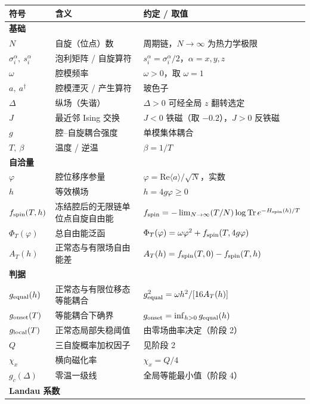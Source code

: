 \documentclass[UTF8,11pt,a4paper]{ctexart}
\begin{document}
{\footnotesize
\begin{longtable}{@{}p{2.1cm}p{6.0cm}p{6.2cm}@{}}
\toprule
符号 & 含义 & 约定 / 取值 \\
\midrule
\endhead
\multicolumn{3}{l}{\textbf{基础}} \\
$N$ & 自旋（位点）数 & 周期链，$N\to\infty$ 为热力学极限 \\
$\sigma_i^\alpha,\ s_i^\alpha$ & 泡利矩阵 / 自旋算符 & $s_i^\alpha=\sigma_i^\alpha/2$，$\alpha=x,y,z$ \\
$\omega$ & 腔模频率 & $\omega>0$，取 $\omega=1$ \\
$a,\ a^\dagger$ & 腔模湮灭 / 产生算符 & 玻色子 \\
$\Delta$ & 纵场（失谐） & $\Delta>0$ 可经全局 $z$ 翻转选定 \\
$J$ & 最近邻 Ising 交换 & $J<0$ 铁磁（取 $-0.2$），$J>0$ 反铁磁 \\
$g$ & 腔--自旋耦合强度 & 单模集体耦合 \\
$T,\ \beta$ & 温度 / 逆温 & $\beta=1/T$ \\
\midrule
\multicolumn{3}{l}{\textbf{自洽量}} \\
$\varphi$ & 腔位移序参量 & $\varphi=\mathrm{Re}\langle a\rangle/\sqrt N$，实数 \\
$h$ & 等效横场 & $h=4g\varphi\ge0$ \\
$f_{\rm spin}(T,h)$ & 冻结腔后的无限链单位点自旋自由能 & $f_{\rm spin}=-\lim_{N\to\infty}(T/N)\log\operatorname{Tr}e^{-H_{\rm spin}(h)/T}$ \\
$\Phi_T(\varphi)$ & 总自由能泛函 & $\Phi_T(\varphi)=\omega\varphi^2+f_{\rm spin}(T,4g\varphi)$ \\
$A_T(h)$ & 正常态与有限场自由能差 & $A_T(h)=f_{\rm spin}(T,0)-f_{\rm spin}(T,h)$ \\
\midrule
\multicolumn{3}{l}{\textbf{判据}} \\
$g_{\rm equal}(h)$ & 正常态与有限位移态等能耦合 & $g_{\rm equal}^2=\omega h^2/[16A_T(h)]$ \\
$g_{\rm onset}(T)$ & 等能耦合下确界 & $g_{\rm onset}=\inf_{h>0}g_{\rm equal}(h)$ \\
$g_{\rm local}(T)$ & 正常态局部失稳阈值 & 由零场曲率决定（阶段 2） \\
$Q$ & 三自旋概率加权因子 & 见阶段 2 \\
$\chi_x$ & 横向磁化率 & $\chi_x=Q/4$ \\
$g_c(\Delta)$ & 零温一级线 & 全局等能最小值（阶段 4） \\
\midrule
\multicolumn{3}{l}{\textbf{Landau 系数}} \\

\end{longtable}}
\end{document}

